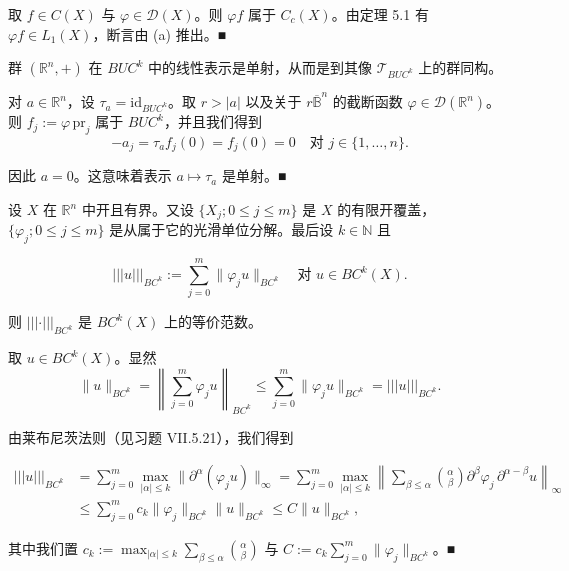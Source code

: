 \begin{application}
\begin{items}
\proofhead
取 $ f \in C(X) $ 与 $ \varphi \in \mathcal{D}(X) $。则 $ \varphi f $ 属于 $ C_{c}(X) $。由定理 5.1 有 $ \varphi f \in L_{1}(X) $，断言由 (a) 推出。\nobreak\hspace{0.35em}■
\item

群 $ (\mathbb{R}^{n},+) $ 在 $ BUC^{k} $ 中的线性表示是单射，从而是到其像 $ \mathcal{T}_{BUC^{k}} $ 上的群同构。

\proofhead
对 $ a \in \mathbb{R}^{n} $，设 $ \tau_{a} = \mathrm{id}_{BUC^{k}} $。取 $ r > |a| $ 以及关于 $ r\overline{\mathbb{B}}^{n} $ 的截断函数 $ \varphi \in \mathcal{D}(\mathbb{R}^{n}) $。则 $ f_{j} := \varphi\,\mathrm{pr}_{j} $ 属于 $ BUC^{k} $，并且我们得到
\[
-a_{j} = \tau_{a}f_{j}(0) = f_{j}(0) = 0 \quad \text{对 } j \in \{1,\ldots,n\} .
\]

因此 $ a = 0 $。这意味着表示 $ a \mapsto \tau_{a} $ 是单射。\nobreak\hspace{0.35em}■

\item

设 $ X $ 在 $ \mathbb{R}^{n} $ 中开且有界。又设 $ \{X_{j} ; 0 \le j \le m\} $ 是 $ X $ 的有限开覆盖，$ \{\varphi_{j} ; 0 \le j \le m\} $ 是从属于它的光滑单位分解。最后设 $ k \in \mathbb{N} $ 且

\[
|||u|||_{BC^{k}} := \sum_{j=0}^{m}\|\varphi_{j}u\|_{BC^{k}} \quad \text{对 } u \in BC^{k}(X) .
\]

则 $ |||\cdot|||_{BC^{k}} $ 是 $ BC^{k}(X) $ 上的等价范数。

\proofhead
取 $ u \in BC^{k}(X) $。显然
\[
\|u\|_{BC^{k}} = \left\|\sum_{j=0}^{m}\varphi_{j}u\right\|_{BC^{k}} \le \sum_{j=0}^{m}\|\varphi_{j}u\|_{BC^{k}} = |||u|||_{BC^{k}} .
\]

由莱布尼茨法则（见习题 VII.5.21），我们得到

\begin{equation*}
\begin{aligned}
|||u|||_{BC^{k}} &= \sum_{j=0}^{m}\max_{|\alpha|\le k}\|\partial^{\alpha}(\varphi_{j}u)\|_{\infty} = \sum_{j=0}^{m}\max_{|\alpha|\le k}\left\|\sum_{\beta\le\alpha}\binom{\alpha}{\beta}\partial^{\beta}\varphi_{j}\,\partial^{\alpha-\beta}u\right\|_{\infty} \\ &\le \sum_{j=0}^{m}c_{k}\|\varphi_{j}\|_{BC^{k}}\|u\|_{BC^{k}} \le C\|u\|_{BC^{k}} ,
\end{aligned}
\end{equation*}

其中我们置 $ c_{k} := \max_{|\alpha|\le k}\sum_{\beta\le\alpha}\binom{\alpha}{\beta} $ 与 $ C := c_{k}\sum_{j=0}^{m}\|\varphi_{j}\|_{BC^{k}} $。\nobreak\hspace{0.35em}■

\end{items}

\end{application}

